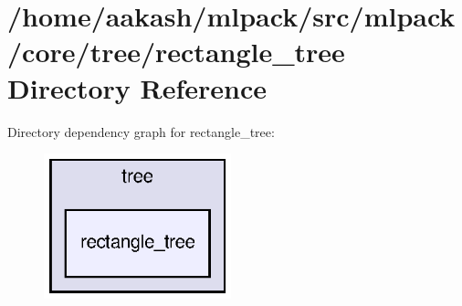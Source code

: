 \section{/home/aakash/mlpack/src/mlpack/core/tree/rectangle\+\_\+tree Directory Reference}
\label{dir_7919cd971787b4fc956a50aa3613ed0a}
Directory dependency graph for rectangle\+\_\+tree\+:
\nopagebreak
\begin{figure}[H]
\begin{center}
\leavevmode
\includegraphics[width=154pt]{dir_7919cd971787b4fc956a50aa3613ed0a_dep}
\end{center}
\end{figure}
